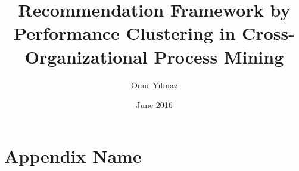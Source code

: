 \documentclass[chaparabic,ceng,ms,12pt,oneandhalf]{metu}
\author{Onur Yılmaz}
\title{Recommendation Framework by Performance Clustering in Cross-Organizational Process Mining}
\date{June 2016}
\theoremstyle{definition}
\begin{document}
\begin{preliminaries}


\end{preliminaries}
%   
% 
%
%



	
%


\appendix
\chapter{Appendix Name}
 
%
% 
\end{document}
